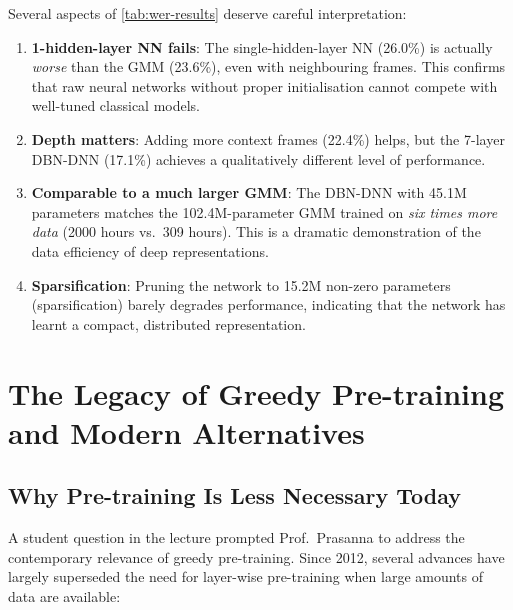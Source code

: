 \documentclass[12pt,a4paper]{article}
\begin{document}
Several aspects of \cref{tab:wer-results} deserve careful interpretation:

\begin{enumerate}[leftmargin=*, label=\arabic*.]
  \item \textbf{1-hidden-layer NN fails}: The single-hidden-layer NN (26.0\%)
        is actually \emph{worse} than the GMM (23.6\%), even with neighbouring
        frames.  This confirms that raw neural networks without proper
        initialisation cannot compete with well-tuned classical models.
  \item \textbf{Depth matters}: Adding more context frames (22.4\%) helps,
        but the 7-layer DBN-DNN (17.1\%) achieves a qualitatively different
        level of performance.
  \item \textbf{Comparable to a much larger GMM}: The DBN-DNN with 45.1M
        parameters matches the 102.4M-parameter GMM trained on \emph{six
        times more data} (2000 hours vs.\ 309 hours).  This is a dramatic
        demonstration of the data efficiency of deep representations.
  \item \textbf{Sparsification}: Pruning the network to 15.2M non-zero
        parameters (sparsification) barely degrades performance, indicating
        that the network has learnt a compact, distributed representation.
\end{enumerate}

\newpage

\section{The Legacy of Greedy Pre-training and Modern Alternatives}
\label{sec:legacy}

\subsection{Why Pre-training Is Less Necessary Today}

A student question in the lecture prompted Prof.\ Prasanna to address the
contemporary relevance of greedy pre-training.  Since 2012, several advances
have largely superseded the need for layer-wise pre-training when large amounts
of data are available:
\end{document}
